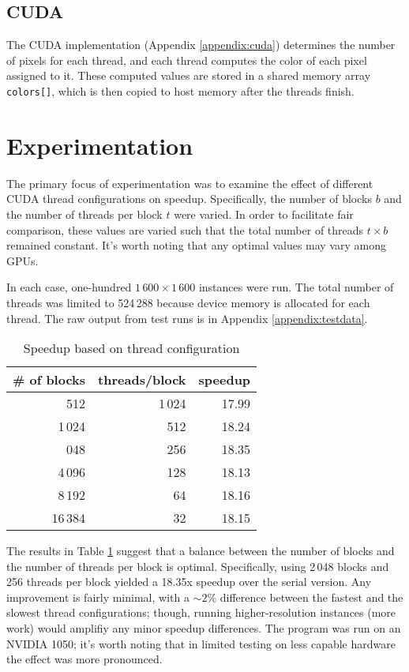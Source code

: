 \documentclass{article}
\begin{document}
    \subsection{CUDA}
        The CUDA implementation (Appendix \ref{appendix:cuda}) determines the number of pixels for each thread, and each thread computes the color of each pixel assigned to it. These computed values are stored in a shared memory array \verb|colors[]|, which is then copied to host memory after the threads finish.

\section{Experimentation}
    The primary focus of experimentation was to examine the effect of different CUDA thread configurations on speedup. Specifically, the number of blocks $b$ and the number of threads per block $t$ were varied. In order to facilitate fair comparison, these values are varied such that the total number of threads $t \times b$ remained constant. It's worth noting that any optimal values may vary among GPUs.

    In each case, one-hundred $1\,600 \times 1\,600$ instances were run. The total number of threads was limited to 524\,288 because device memory is allocated for each thread. The raw output from test runs is in Appendix \ref{appendix:testdata}.

    \def\boxit#1{%
      \smash{\fboxsep=0pt\llap{\rlap{\fbox{\strut\makebox[#1]{}}}~}}\ignorespaces
    }

    \renewcommand{\arraystretch}{1.5}
    \begin{table}[h]
    \centering
    \caption{Speedup based on thread configuration}
    \begin{tabular}{r | r || r}\label{tab:speedup}
    \# of blocks & threads/block & speedup \\ \hline
    512                 & 1\,024    & 17.99 \\
    1\,024              & 512       & 18.24 \\
    \boxit{150pt}2\,048 & 256       & 18.35 \\
    4\,096              & 128       & 18.13 \\
    8\,192              & 64        & 18.16 \\
    16\,384             & 32        & 18.15
    \end{tabular}
    \end{table}

    The results in Table \ref{tab:speedup} suggest that a balance between the number of blocks and the number of threads per block is optimal. Specifically, using 2\,048 blocks and 256 threads per block yielded a 18.35x speedup over the serial version. Any improvement is fairly minimal, with a $\sim 2\%$ difference between the fastest and the slowest thread configurations; though, running higher-resolution instances (more work) would amplifiy any minor speedup differences. The program was run on an NVIDIA 1050; it's worth noting that in limited testing on less capable hardware the effect was more pronounced.
\end{document}
